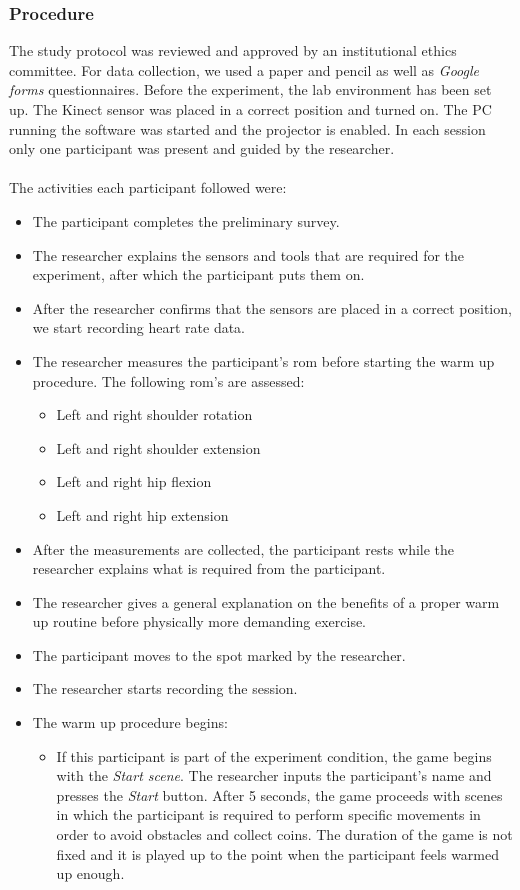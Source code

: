 \subsubsection{Procedure}
The study protocol was reviewed and approved by an institutional ethics committee. For data collection, we used a  paper and pencil as well as \textit{Google forms} questionnaires. Before the experiment, the lab environment has been set up. The Kinect sensor was placed in a correct position and turned on. The PC running the software was started and the projector is enabled. In each session only one participant was present and guided by the researcher.\\\\The activities each participant followed were:
\begin{itemize}
\item The participant completes the preliminary survey.
\item The researcher explains the sensors and tools that are required for the experiment, after which the participant puts them on. 
\item After the researcher confirms that the sensors are placed in a correct position, we start recording heart rate data.
\item The researcher measures the participant's \acrshort{rom} before starting the warm up procedure. The following \acrshort{rom}'s are assessed: 
\begin{itemize}
\item Left and right shoulder rotation
\item Left and right shoulder extension
\item Left and right hip flexion
\item Left and right hip extension
\end{itemize}
\item After the measurements are collected, the participant rests while the researcher explains what is required from the participant.
\item The researcher gives a general explanation on the benefits of a proper warm up routine before physically more demanding exercise.
\item The participant moves to the spot marked by the researcher.
\item The researcher starts recording the session. 
\item The warm up procedure begins:
\begin{itemize}
\item If this participant is part of the experiment condition, the game begins with the \textit{Start scene}. The researcher inputs the participant's name and presses the \textit{Start} button. After 5 seconds, the game proceeds with scenes in which the participant is required to perform specific movements in order to avoid obstacles and collect coins. The duration of the game is not fixed and it is played up to the point when the participant feels warmed up enough. 

\end{itemize}
\end{itemize}
